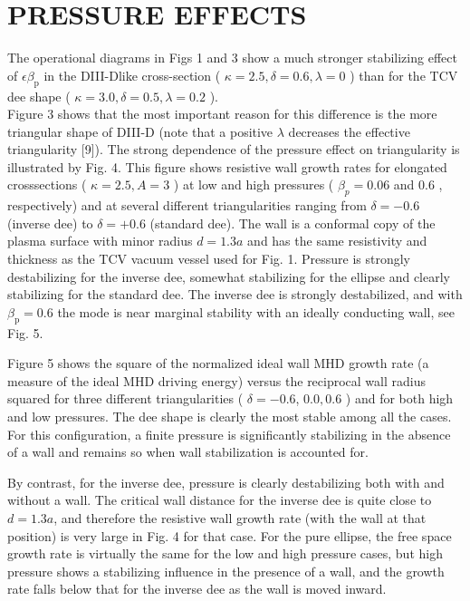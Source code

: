 \documentclass[10pt]{article}
\begin{document}
\section{PRESSURE EFFECTS}
The operational diagrams in Figs 1 and 3 show a much stronger stabilizing effect of $\epsilon \beta_{\mathrm{p}}$ in the DIII-Dlike cross-section ( $\kappa=2.5, \delta=0.6, \lambda=0$ ) than for the TCV dee shape ( $\kappa=3.0, \delta=0.5, \lambda=0.2$ ).\\
Figure 3 shows that the most important reason for this difference is the more triangular shape of DIII-D (note that a positive $\lambda$ decreases the effective triangularity [9]). The strong dependence of the pressure effect on triangularity is illustrated by Fig. 4. This figure shows resistive wall growth rates for elongated crosssections ( $\kappa=2.5, A=3$ ) at low and high pressures ( $\beta_{p}=0.06$ and 0.6 , respectively) and at several different triangularities ranging from $\delta=-0.6$ (inverse dee) to $\delta=+0.6$ (standard dee). The wall is a conformal copy of the plasma surface with minor radius $d=1.3 a$ and has the same resistivity and thickness as the TCV vacuum vessel used for Fig. 1. Pressure is strongly destabilizing for the inverse dee, somewhat stabilizing for the ellipse and clearly stabilizing for the standard dee. The inverse dee is strongly destabilized, and with $\beta_{\mathrm{p}}=0.6$ the mode is near marginal stability with an ideally conducting wall, see Fig. 5.

Figure 5 shows the square of the normalized ideal wall MHD growth rate (a measure of the ideal MHD driving energy) versus the reciprocal wall radius squared for three different triangularities ( $\delta=-0.6$, $0.0,0.6$ ) and for both high and low pressures. The dee shape is clearly the most stable among all the cases. For this configuration, a finite pressure is significantly stabilizing in the absence of a wall and remains so when wall stabilization is accounted for.

By contrast, for the inverse dee, pressure is clearly destabilizing both with and without a wall. The critical wall distance for the inverse dee is quite close to $d=1.3 a$, and therefore the resistive wall growth rate (with the wall at that position) is very large in Fig. 4 for that case. For the pure ellipse, the free space growth rate is virtually the same for the low and high pressure cases, but high pressure shows a stabilizing influence in the presence of a wall, and the growth rate falls below that for the inverse dee as the wall is moved inward.
\end{document}
